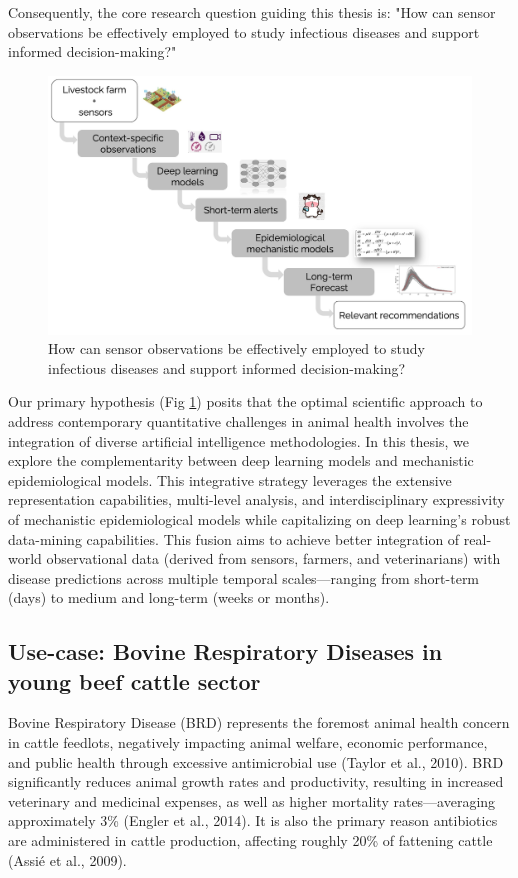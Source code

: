Consequently, the core research question guiding this thesis is: "How can sensor observations be effectively employed to study infectious diseases and support informed decision-making?"

\begin{figure}
  \includegraphics[width=\linewidth]{figures/chap1/chap1-outline.jpg}
  \caption{How can sensor observations be effectively employed to study infectious diseases and support informed decision-making?}
  \label{fig:chap1-outline}
\end{figure}
\newpage

Our primary hypothesis (Fig \ref{fig:chap1-outline}) posits that the optimal scientific approach to address contemporary quantitative challenges in animal health involves the integration of diverse artificial intelligence methodologies. In this thesis, we explore the complementarity between deep learning models and mechanistic epidemiological models. This integrative strategy leverages the extensive representation capabilities, multi-level analysis, and interdisciplinary expressivity of mechanistic epidemiological models while capitalizing on deep learning’s robust data-mining capabilities. This fusion aims to achieve better integration of real-world observational data (derived from sensors, farmers, and veterinarians) with disease predictions across multiple temporal scales—ranging from short-term (days) to medium and long-term (weeks or months).


\subsection{Use-case: Bovine Respiratory Diseases in young beef cattle sector}

Bovine Respiratory Disease (BRD) represents the foremost animal health concern in cattle feedlots, negatively impacting animal welfare, economic performance, and public health through excessive antimicrobial use (Taylor et al., 2010). BRD significantly reduces animal growth rates and productivity, resulting in increased veterinary and medicinal expenses, as well as higher mortality rates—averaging approximately 3\% (Engler et al., 2014). It is also the primary reason antibiotics are administered in cattle production, affecting roughly 20\% of fattening cattle (Assié et al., 2009).

